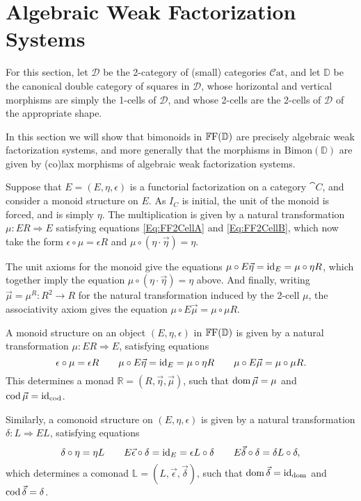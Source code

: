 
\chapter{Algebraic Weak Factorization Systems}

For this section, let $\mathcal{D}$ be the 2-category of (small) categories $\mathcal{C}\mathrm{at}$, and let $\mathbb{D}$ be the canonical double category of squares in $\mathcal{D}$, whose horizontal and vertical morphisms are simply the 1-cells of $\mathcal{D}$, and whose 2-cells are the 2-cells of $\mathcal{D}$ of the appropriate shape.

In this section we will show that bimonoids in $\mathbb{F}\mathrm{F}(\mathbb{D})$ are precisely algebraic weak factorization systems, and more generally that the morphisms in $\mathrm{Bimon}(\mathbb{D})$ are given by (co)lax morphisms of algebraic weak factorization systems.

Suppose that $E=(E,\eta,\epsilon)$ is a functorial factorization on a category $\cat{C}$, and consider a monoid structure on $E$. As $I_C$ is initial, the unit of the monoid is forced, and is simply $\eta$. The multiplication is given by a natural transformation $\mu\colon ER\Rightarrow E$ satisfying equations \eqref{Eq:FF2CellA} and \eqref{Eq:FF2CellB}, which now take the form $\epsilon\circ\mu = \epsilon R$ and $\mu\circ(\eta\cdot\vec{\eta})=\eta$.

The unit axioms for the monoid give the equations $\mu\circ E\vec{\eta}=\operatorname{id}_E=\mu\circ\eta R$, which together imply the equation $\mu\circ(\eta\cdot\vec{\eta})=\eta$ above. And finally, writing $\vec{\mu}=\mu^R\colon R^2\to R$ for the natural transformation induced by the 2-cell $\mu$, the associativity axiom gives the equation $\mu\circ E\vec{\mu}=\mu\circ\mu R$.

\begin{proposition}
	A monoid structure on an object $(E,\eta,\epsilon)$ in $\mathbb{F}\mathrm{F}(\mathbb{\mathbb{D}})$ is given by a natural transformation $\mu\colon ER\Rightarrow E$, satisfying equations
	\begin{equation}
		\epsilon\circ\mu=\epsilon R \qquad 
			\mu\circ E\vec{\eta}=\operatorname{id}_E=\mu\circ\eta R \qquad 
			\mu\circ E\vec{\mu}=\mu\circ\mu R.
	\end{equation}
	This determines a monad $\mathbb{R}=(R,\vec{\eta},\vec{\mu})$, such that $\operatorname{dom}\vec{\mu}=\mu$ and $\operatorname{cod}\vec{\mu}=\operatorname{id}_{\operatorname{cod}}$.

	Similarly, a comonoid structure on $(E,\eta,\epsilon)$ is given by a natural transformation $\delta\colon L\Rightarrow EL$, satisfying equations
	\begin{equation}
		\delta\circ\eta=\eta L \qquad 
			E\vec{\epsilon}\circ\delta=\operatorname{id}_E=\epsilon L\circ\delta \qquad
			E\vec{\delta}\circ\delta=\delta L\circ\delta,
	\end{equation}
	which determines a comonad $\mathbb{L}=(L,\vec{\epsilon},\vec{\delta})$, such that $\operatorname{dom}\vec{\delta}=\operatorname{id}_{\operatorname{dom}}$ and $\operatorname{cod}\vec{\delta}=\delta$.
\end{proposition}

